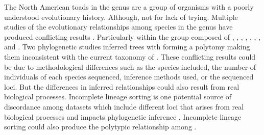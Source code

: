 The North American toads in the genus \anaxyrus are a group of organisms with a 
poorly understood evolutionary history. 
Although, not for lack of trying.
Multiple studies of the evolutionary relationships among species in the genus have produced
conflicting results \parencite{fontenot2011,graybeal1997,masta2002,pramuk2007,pyron2011,portik2023}.
Particularly within the \americanus group composed of \amer, \baxteri, \fowl, 
\hemiophrys, \houstonensis, \microscaphus, \terr, and \wood.
Two phylogenetic studies inferred trees with \fowl forming a polytomy making 
them inconsistent with the current taxonomy of \anaxyrus \parencite{fontenot2011,masta2002}.
These conflicting results could be due to methodological differences such as
the species included, the number of individuals of each species sequenced, inference 
methods used, or the sequenced loci. 
But the differences in inferred relationships could also result from real
biological processes. 
Incomplete lineage sorting is one potential source of discordance among datasets 
which include different loci that arises from real biological processes and 
impacts phylogenetic inference \parencite{kubatko2007}. 
Incomplete lineage sorting could also produce the polytypic relationship among
\fowl. 






